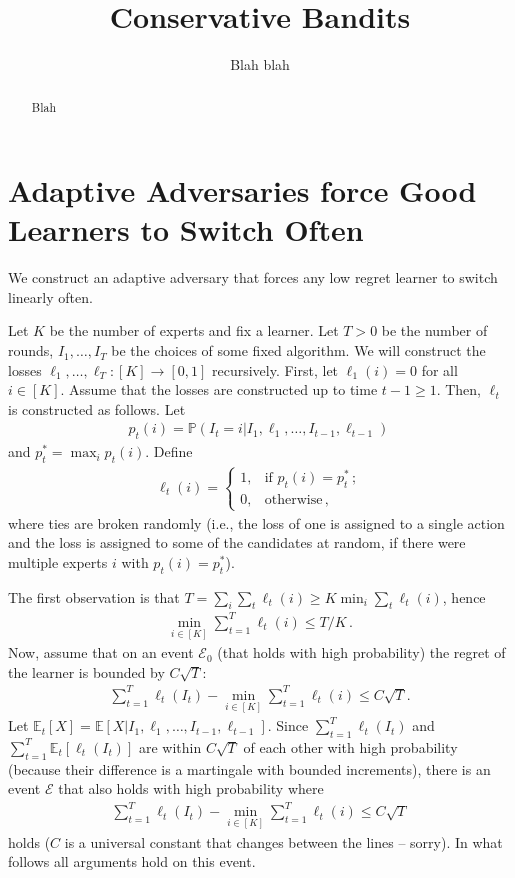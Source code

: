 \documentclass{article} %
\title{Conservative Bandits}
\author{
Blah blah
}
\renewcommand{\Pr}{\mathds{P}}
\newcommand{\Prob}[1]{\Pr\left( #1 \right)}
\newcommand{\EE}[1]{\mathbb{E}\left[ #1 \right]}
\newcommand{\EEt}[1]{\mathbb{E}_t\left[ #1 \right]}
\theoremstyle{plain}
\theoremstyle{definition}
\theoremstyle{remark}
\begin{document}
\maketitle

\begin{abstract}
Blah 
\end{abstract}


\section{Adaptive Adversaries force Good Learners to Switch Often}
We construct an adaptive adversary that forces any low regret learner to switch linearly often.

Let $K$ be the number of experts and fix a learner.
Let $T>0$ be the number of rounds, $I_1,\dots, I_T$ be the choices of some fixed algorithm.
We will construct the losses $\ell_1,\dots,\ell_T: [K] \to [0,1]$ recursively.
First, let $\ell_1(i) = 0$ for all $i\in [K]$.
Assume that the losses are constructed up to time $t-1\ge 1$. Then, $\ell_t$ is constructed as follows.
Let
\begin{align*}
p_t(i) = \Prob{I_t = i|I_1,\ell_1, \dots, I_{t-1},\ell_{t-1} }\,
\end{align*}
and $p_t^* = \max_i p_t(i)$.
Define
\begin{align*}
\ell_t(i) = 
\begin{cases}
1, & \text{if } p_t(i) = p_t^*\,;\\
0, & \text{otherwise}\,,
\end{cases}
\end{align*}
where ties are broken randomly (i.e., the loss of one is assigned to a single action and the loss is assigned to some of the candidates at random, if there were multiple experts $i$ with $p_t(i) = p_t^*$).

The first observation is that $T = \sum_i \sum_t \ell_t(i) \ge K\min_i \sum_t \ell_t(i)$, hence 
\begin{align}
\label{eq:smalltotalloss}
\min_{i\in [K]} \sum_{t=1}^T \ell_t(i) \le T/K\,.
\end{align}
Now, assume that on an event  $\mathcal{E}_0$ (that holds with high probability) the regret of the learner is bounded by $C \sqrt{T}$:
\begin{align*}
{ \sum_{t=1}^T \ell_t(I_t)  - \min_{i\in [K]} \sum_{t=1}^T \ell_t(i) } \le C \sqrt{T}.
\end{align*}
Let $\EEt{X} = \EE{ X | I_1,\ell_1,\dots,I_{t-1},\ell_{t-1}}$.
Since $\sum_{t=1}^T \ell_t(I_t)$ and $\sum_{t=1}^T \EEt{\ell_t(I_t)}$ are within $C\sqrt{T}$ of each other with high probability
(because their difference is a martingale with bounded increments),
there is an event $\mathcal{E}$ that also holds with high probability where
\begin{align}
\label{eq:regretbound}
{ \sum_{t=1}^T \ell_t(I_t)  - \min_{i\in [K]} \sum_{t=1}^T \ell_t(i) } \le C \sqrt{T}
\end{align}
holds ($C$ is a universal constant that changes between the lines -- sorry).
In what follows all arguments hold on this event.
\end{document}
